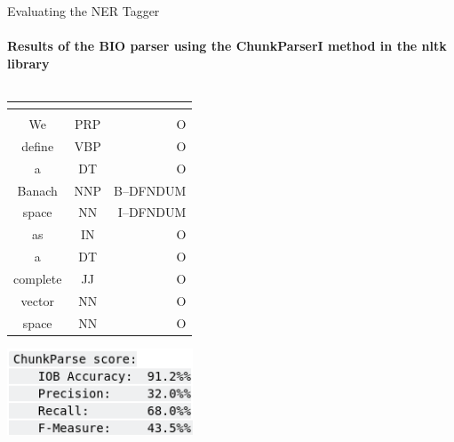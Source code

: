\documentclass{beamer}
\begin{document}
\begin{frame}{Evaluating the NER Tagger} 
    \framesubtitle{Results of the BIO parser using the ChunkParserI method in the \textbf{nltk} library}
    \begin{columns}[T]
        \begin{column}{0.5\textwidth}
            \begin{tabular}{|c|c|r|}
                \hline
                \hline
        \multicolumn{2}{|c|}{\color{blue}{Input}} & \color{purple}{Output} \\
                \hline
                \hline
                \color{blue}{Token} & \color{blue}{POS} & \color{purple}{NER}\\
                \hline
                  We&PRP&O\\
                  \hline
                  define&VBP&O\\
                  \hline
                  a&DT&O\\
                  \hline
                  Banach&NNP&B--DFNDUM\\
                  \hline
                  space&NN&I--DFNDUM\\
                  \hline
                  as&IN&O\\
                  \hline
                  a&DT&O\\
                  \hline
                  complete&JJ&O\\
                  \hline
                  vector&NN&O\\
                  \hline
                  space&NN&O\\
                  \hline
            \end{tabular}
    \includegraphics[width=0.6\textwidth]{BIO_stats.png}
        \end{column}
        \begin{column}{0.5\textwidth}
            
        \end{column}
    \end{columns}
\end{frame}
\end{document}
